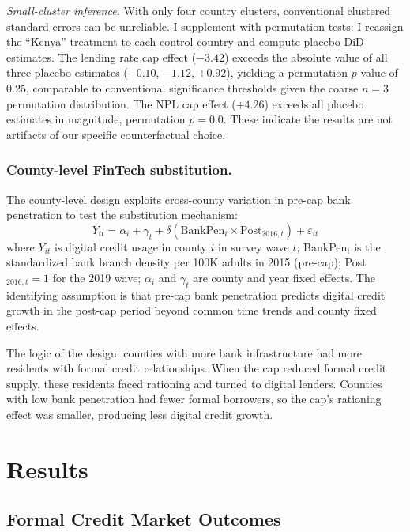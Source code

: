 \documentclass[12pt]{article}
\begin{document}
\textit{Small-cluster inference.} With only four country clusters, conventional clustered standard errors can be unreliable. I supplement with permutation tests: I reassign the ``Kenya'' treatment to each control country and compute placebo DiD estimates. The lending rate cap effect ($-3.42$) exceeds the absolute value of all three placebo estimates ($-0.10$, $-1.12$, $+0.92$), yielding a permutation $p$-value of 0.25, comparable to conventional significance thresholds given the coarse $n=3$ permutation distribution. The NPL cap effect ($+4.26$) exceeds all placebo estimates in magnitude, permutation $p = 0.0$. These indicate the results are not artifacts of our specific counterfactual choice.

\subsubsection*{County-level FinTech substitution.}
The county-level design exploits cross-county variation in pre-cap bank penetration to test the substitution mechanism:
\begin{equation}
Y_{it} = \alpha_i + \gamma_t + \delta (\text{BankPen}_i \times \text{Post}_{2016,t}) + \varepsilon_{it}
\end{equation}
where $Y_{it}$ is digital credit usage in county $i$ in survey wave $t$; BankPen$_i$ is the standardized bank branch density per 100K adults in 2015 (pre-cap); Post$_{2016,t} = 1$ for the 2019 wave; $\alpha_i$ and $\gamma_t$ are county and year fixed effects. The identifying assumption is that pre-cap bank penetration predicts digital credit growth in the post-cap period beyond common time trends and county fixed effects.

The logic of the design: counties with more bank infrastructure had more residents with formal credit relationships. When the cap reduced formal credit supply, these residents faced rationing and turned to digital lenders. Counties with low bank penetration had fewer formal borrowers, so the cap's rationing effect was smaller, producing less digital credit growth.

\section{Results}

\subsection{Formal Credit Market Outcomes}
\end{document}

